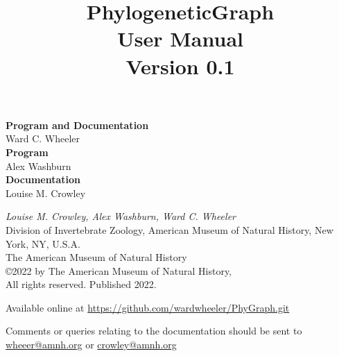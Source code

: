 \documentclass[11pt]{book}
\begin{document}
	
	\title{PhylogeneticGraph\\User Manual\\Version 0.1}
	
	\maketitle
	\newpage
	
	\begin{flushleft}
		\textbf {Program and Documentation} \\ Ward C. Wheeler \\
		\vspace*{0.50cm}
		\textbf {Program} \\ Alex Washburn  \\
		\vspace*{0.50cm}
		\textbf{Documentation} \\ Louise M. Crowley
	\end{flushleft}
	
	\vspace*{12.50cm}
	
	\begin{flushleft}
		\small
		{\it
			Louise M. Crowley, Alex Washburn,  Ward C. Wheeler \\
		}
		Division of Invertebrate Zoology, American Museum of Natural History, New York, NY, U.S.A.\\
		\smallskip
		The American Museum of Natural History\\
		\copyright  2022 by The American Museum of Natural History, \\
		All rights reserved. Published 2022.
		
		\vspace*{0.25cm}
		
		Available online at \url{https://github.com/wardwheeler/PhyGraph.git} 
		
		Comments or queries relating to the documentation should be sent to \href{mailto:wheeler@amnh.org}{wheeer@amnh.org} 
		or \href{mailto:crowley@amnh.org}{crowley@amnh.org}
	\end{flushleft}
	
\end{document}

